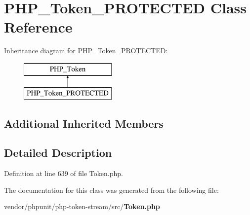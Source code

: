 \section{P\+H\+P\+\_\+\+Token\+\_\+\+P\+R\+O\+T\+E\+C\+T\+E\+D Class Reference}
\label{class_p_h_p___token___p_r_o_t_e_c_t_e_d}
Inheritance diagram for P\+H\+P\+\_\+\+Token\+\_\+\+P\+R\+O\+T\+E\+C\+T\+E\+D\+:\begin{figure}[H]
\begin{center}
\leavevmode
\includegraphics[height=2.000000cm]{class_p_h_p___token___p_r_o_t_e_c_t_e_d}
\end{center}
\end{figure}
\subsection*{Additional Inherited Members}


\subsection{Detailed Description}


Definition at line 639 of file Token.\+php.



The documentation for this class was generated from the following file\+:\begin{DoxyCompactItemize}
\item 
vendor/phpunit/php-\/token-\/stream/src/{\bf Token.\+php}\end{DoxyCompactItemize}
